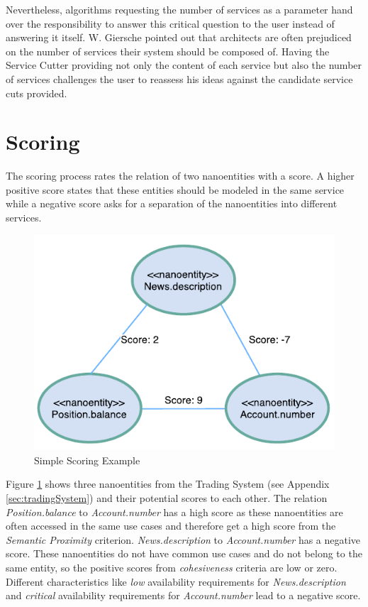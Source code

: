 Nevertheless, algorithms requesting the number of services as a parameter hand over the responsibility to answer this critical question to the user instead of answering it itself. W. Giersche pointed out that architects are often prejudiced on the number of services their system should be composed of. Having the Service Cutter providing not only the content of each service but also the number of services challenges the user to reassess his ideas against the candidate service cuts provided. 



\section{Scoring}
\label{sec:scores}

The scoring process rates the relation of two nanoentities with a score. A higher positive score states that these entities should be modeled in the same service while a negative score asks for a separation of the nanoentities into different services.

\begin{figure}[H]
	\begin{center}
		\includegraphics[scale=1]{diagrams/scoring_example.pdf}
		\caption{Simple Scoring Example}
		\label{fig:scoringExample}
	\end{center}
\end{figure}

Figure \ref{fig:scoringExample} shows three nanoentities from the Trading System (see Appendix \ref{sec:tradingSystem}) and their potential scores to each other. The relation \textit{Position.balance} to \textit{Account.number} has a high score as these nanoentities are often accessed in the same use cases and therefore get a high score from the \textit{Semantic Proximity} criterion. \textit{News.description} to \textit{Account.number} has a negative score. These nanoentities do not have common use cases and do not belong to the same entity, so the positive scores from \textit{cohesiveness} criteria are low or zero. Different characteristics like \textit{low} availability requirements for \textit{News.description} and \textit{critical} availability requirements for \textit{Account.number} lead to a negative score. 

